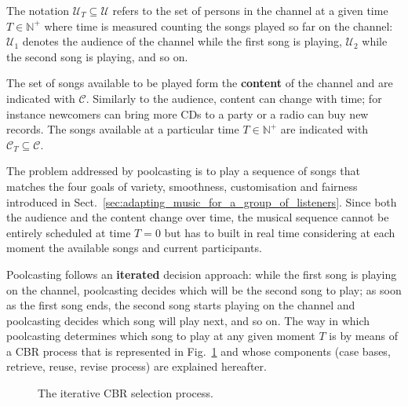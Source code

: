 The notation $\mathcal{U}_T \subseteq \mathcal{U}$ refers to the set of persons in the channel at a given time $T \in \mathbb{N}^+$ where time is measured counting the songs played so far on the channel: $\mathcal{U}_1$ denotes the audience of the channel while the first song is playing, $\mathcal{U}_2$ while the second song is playing, and so on.

The set of songs available to be played form the \textbf{content} of the channel and are indicated with $\mathcal{C}$.
Similarly to the audience, content can change with time; for instance newcomers can bring more CDs to a party or a radio can buy new records.
The songs available at a particular time  $T \in \mathbb{N}^+$ are indicated with $\mathcal{C}_T \subseteq \mathcal{C}$.

The problem addressed by poolcasting is to play a sequence of songs that matches the four goals of variety, smoothness, customisation and fairness introduced in Sect.~\ref{sec:adapting_music_for_a_group_of_listeners}.
Since both the audience and the content change over time, the musical sequence cannot be entirely scheduled at time $T = 0$ but has to built in real time considering at each moment the available songs and current participants.

Poolcasting follows an \textbf{iterated} decision approach: 
while the first song is playing on the channel, poolcasting decides which will be the second song to play; as soon as the first song ends, the second song starts playing on the channel and poolcasting decides which song will play next, and so on.
%
The way in which poolcasting determines which song to play at any given moment $T$ is by means of a CBR process that is represented in 
Fig.~\ref{fig:iterative_cbr} and whose components (case bases, retrieve, reuse, revise process) are explained hereafter.
%
\begin{figure}[bthp]
\centering \setlength{\abovecaptionskip}{3pt}
\caption{The iterative CBR selection process.}
\label{fig:iterative_cbr}
\end{figure}










